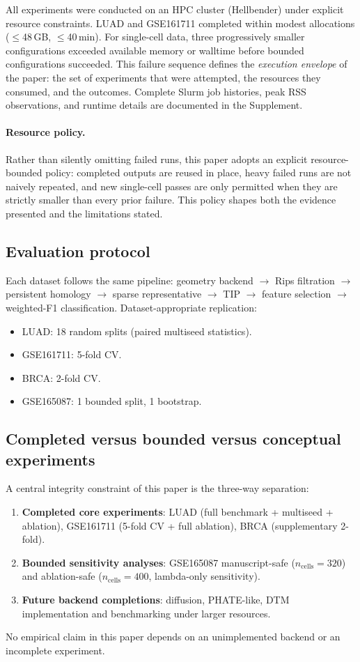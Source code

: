 \documentclass[11pt]{article}
\begin{document}
All experiments were conducted on an HPC cluster (Hellbender) under explicit resource constraints.
LUAD and GSE161711 completed within modest allocations ($\le$48\,GB, $\le$40\,min).
For single-cell data, three progressively smaller configurations exceeded available memory or walltime before bounded configurations succeeded.
This failure sequence defines the \emph{execution envelope} of the paper: the set of experiments that were attempted, the resources they consumed, and the outcomes.
Complete Slurm job histories, peak RSS observations, and runtime details are documented in the Supplement.

\paragraph{Resource policy.}
Rather than silently omitting failed runs, this paper adopts an explicit resource-bounded policy: completed outputs are reused in place, heavy failed runs are not naively repeated, and new single-cell passes are only permitted when they are strictly smaller than every prior failure.
This policy shapes both the evidence presented and the limitations stated.

\subsection{Evaluation protocol}

Each dataset follows the same pipeline: geometry backend $\to$ Rips filtration $\to$ persistent homology $\to$ sparse representative $\to$ TIP $\to$ feature selection $\to$ weighted-F1 classification.
Dataset-appropriate replication:
\begin{itemize}[leftmargin=1.5em]
\item LUAD: 18 random splits (paired multiseed statistics).
\item GSE161711: 5-fold CV.
\item BRCA: 2-fold CV.
\item GSE165087: 1 bounded split, 1 bootstrap.
\end{itemize}

\subsection{Completed versus bounded versus conceptual experiments}

A central integrity constraint of this paper is the three-way separation:
\begin{enumerate}[leftmargin=1.5em]
\item \textbf{Completed core experiments}: LUAD (full benchmark + multiseed + ablation), GSE161711 (5-fold CV + full ablation), BRCA (supplementary 2-fold).
\item \textbf{Bounded sensitivity analyses}: GSE165087 manuscript-safe ($n_{\text{cells}} = 320$) and ablation-safe ($n_{\text{cells}} = 400$, lambda-only sensitivity).
\item \textbf{Future backend completions}: diffusion, PHATE-like, DTM implementation and benchmarking under larger resources.
\end{enumerate}
No empirical claim in this paper depends on an unimplemented backend or an incomplete experiment.
\end{document}
